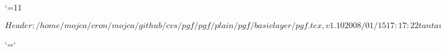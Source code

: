 %
%
%


\edef\pgfatcode{\the\catcode`\@}
\catcode`\@=11



\ProvidesPackageRCS $Header: /home/mojca/cron/mojca/github/cvs/pgf/pgf/plain/pgf/basiclayer/pgf.tex,v 1.10 2008/01/15 17:17:22 tantau Exp $




%
%
%

\catcode`\@=\pgfatcode

\endinput
